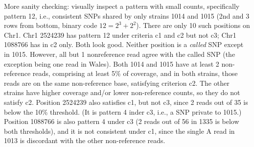 \documentclass{article}\usepackage[]{graphicx}\usepackage[]{color}
\begin{document}
More sanity checking: visually inspect a pattern with small counts, specifically pattern 12, i.e., consistent SNPs
shared by only strains 1014 and 1015 (2nd and 3 rows from bottom, binary code $12=2^3+2^2$).  There are only 10 such
positions on Chr1.  Chr1 2524239 has pattern 12 under criteria c1 and c2 but not c3; Chr1 1088766 has in c2 only.  Both
look good.  Neither position is a \emph{called} SNP except in 1015.  However, all but 1 nonreference read agree with the
called SNP (the exception being one read in Wales).  Both 1014 and 1015 have at least 2 non-reference reads, comprising
at least 5\% of coverage, and in both strains, those reads are on the same non-reference base, satisfying criterion c2.
The other strains have higher coverage and/or lower non-reference counts, so they do not satisfy c2.  Position 2524239
also satisfies c1, but not c3, since 2 reads out of 35 is below the 10\% threshold.  (It is pattern 4 inder c3, i.e., a
SNP private to 1015.)  Position 1088766 is also pattern 4 under c3 (2 reads out of 56 in 1335 is below both thresholds),
and it is not consistent under c1, since the single A read in 1013 is discordant with the other non-reference reads.
\end{document}
